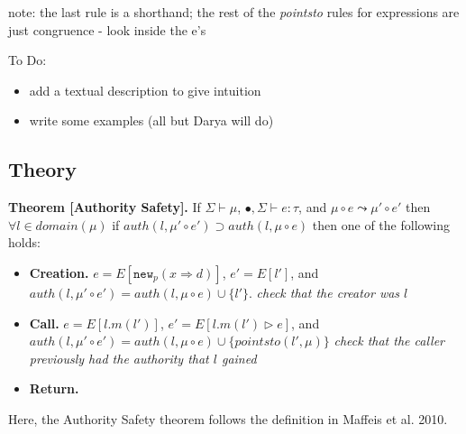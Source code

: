 \documentclass{llncs}
\newcommand{\keywadj}[1]{\mathtt{#1}}
\newcommand{\stepsto}{\leadsto}
\begin{document}
note: the last rule is a shorthand; the rest of the \textit{pointsto} rules for expressions are just congruence - look inside the e's

To Do:

\begin{itemize}
\item add a textual description to give intuition
\item write some examples (all but Darya will do)
\end{itemize}

\newpage

\subsection{Theory}

\textbf{Theorem [Authority Safety].}  If $\Sigma \vdash \mu$, $\bullet, \Sigma \vdash e : \tau$, and $\mu \circ e \stepsto \mu' \circ e'$ then $\forall l \in domain(\mu)$ if $auth(l,\mu' \circ e') \supset auth(l,\mu \circ e)$ then one of the following holds:

\begin{itemize}
  \item \textbf{Creation.} $e = E[\keywadj{new}_p(x \Rightarrow d)]$, $e' = E[l']$, and $auth(l,\mu' \circ e') = auth(l,\mu \circ e) \cup \{ l' \}$.  \textit{check that the creator was $l$}
  \item \textbf{Call.} $e = E[l.m(l')]$, $e' = E[l.m(l') \rhd e]$, and $auth(l,\mu' \circ e') = auth(l,\mu \circ e) \cup \{ pointsto(l',\mu) \}$  \textit{check that the caller previously had the authority that $l$ gained}
  \item \textbf{Return.}
\end{itemize}

Here, the Authority Safety theorem follows the definition in Maffeis et al. 2010.
\end{document}

